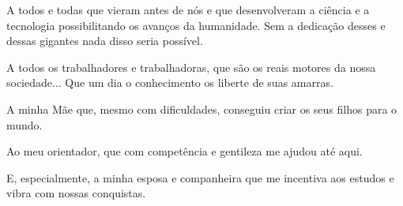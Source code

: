 \begin{agradecimentos}
	\par A todos e todas que vieram antes de nós e que desenvolveram a ciência e a tecnologia possibilitando os avanços da humanidade.  Sem a dedicação desses e dessas gigantes nada disso seria possível.
	\par A todos os trabalhadores e trabalhadoras, que são os reais motores da nossa sociedade... Que um dia o conhecimento os liberte de suas amarras.
	\par A minha Mãe que, mesmo com dificuldades, conseguiu criar os seus filhos para o mundo.
	\par Ao meu orientador, que com competência e gentileza me ajudou até aqui.
	\par E, especialmente, a minha esposa e companheira que me incentiva aos estudos e vibra com nossas conquistas.
\end{agradecimentos}